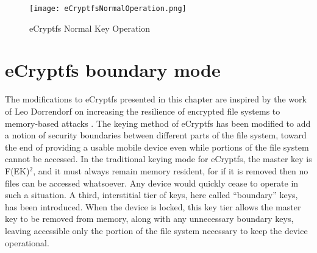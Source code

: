 \begin{figure}[!htb]
\begin{center}
\texttt{[image: eCryptfsNormalOperation.png]} \end{center}
\caption{eCryptfs Normal Key Operation} \label{fig:ecryptfsnormal} \end{figure}

\section{eCryptfs boundary mode}
\label{sec:boundarymode}
The modifications to eCryptfs presented in this chapter are inspired by the work of Leo Dorrendorf on increasing the resilience of
encrypted file systems to memory-based attacks \cite{Dorrendorf2011}. The keying method of eCryptfs has been modified to add a
notion of security boundaries between different parts of the file system, toward the end of providing a usable mobile device even
while portions of the file system cannot be accessed. In the traditional keying mode for eCryptfs, the master key is
F(EK)$^{2}$, and it must always remain memory resident, for if it is removed then no files can be accessed whatsoever.
Any device would quickly cease to operate in such a situation. A third, interstitial tier of keys, here called ``boundary'' keys, has
been introduced. When the device is locked, this key tier allows the master key to be removed from memory, along with any unnecessary
boundary keys, leaving accessible only the portion of the file system necessary to keep the device operational.

